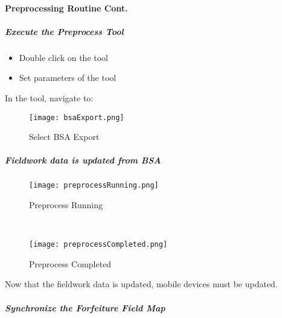  \paragraph{Preprocessing Routine Cont.}


  \subparagraph{Execute the Preprocess Tool}
  \vspace{.15in}

  \begin{itemize}
  \item Double click on the tool 
  \item Set parameters of the tool
  \end{itemize}
 
 \vspace{.15in}

 \noindent In the tool, navigate to:
  \noindent \textcolor{HyperlinkBlue1}{\scriptsize{}}
 
  \begin{figure}[h!]
  \centering
      \texttt{[image: bsaExport.png]}
  \vspace{-.1in}

  \caption{Select BSA Export}
 \end{figure}
 
 {\bigbtn{}  \lookArrow} 

\clearpage


\subparagraph*{Fieldwork data is updated from BSA}




  \begin{figure}[h!]

\centering
     \texttt{[image: preprocessRunning.png]}
\caption{Preprocess Running}
  \vspace{.5in}
 
  \HRule \\[.4cm] %
  \vspace{.5in}
    
     \texttt{[image: preprocessCompleted.png]}
\caption{Preprocess Completed}
 \end{figure}


\noindent Now that the fieldwork data is updated, mobile devices must be updated. 



\clearpage


 \subparagraph{Synchronize the Forfeiture Field Map}
  \vspace{.2in}
  
